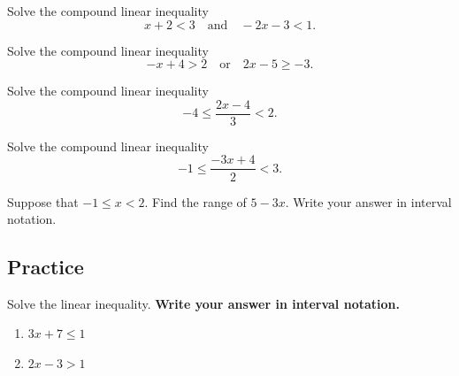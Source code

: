 \begin{example}

Solve the compound linear inequality \[
x+2<3\quad \text{and}\quad -2x-3<1.
\]

\end{example}
\vspace*{6\baselineskip}

\begin{example}

Solve the compound linear inequality\\
\[
-x+4>2 \quad \text{or} \quad 2x-5\geq -3.
\]

\end{example}
\vspace*{6\baselineskip}

\begin{example}

Solve the compound linear inequality \[
-4\leq\dfrac{2x-4}{3}<2.
\]

\end{example}
\vspace*{6\baselineskip}

\begin{example}

Solve the compound linear inequality \[
-1\leq \dfrac{-3x+4}{2}<3.
\]

\end{example}
\vspace*{6\baselineskip}

\begin{example}

Suppose that \(-1\le x < 2\). Find the range of \(5-3x\). Write your
answer in interval notation.

\end{example}
\vspace*{6\baselineskip}

\subsection{Practice}

\begin{exercise}

Solve the linear inequality. \textbf{Write your answer in interval
notation.}

\begin{enumerate}
\item
  \(3x + 7 \leq 1\)
\item
  \(2x-3>1\)
\end{enumerate}

\end{exercise}

